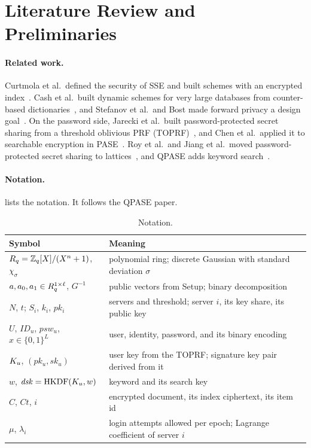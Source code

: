 \section{Literature Review and Preliminaries}
\label{sec:background}

\paragraph{Related work.} Curtmola et al.\ defined the security of SSE and built schemes with an encrypted
index~\cite{curtmola2006sse}. Cash et al.\ built dynamic schemes for very large databases from counter-based
dictionaries~\cite{cash2014dynamic}, and Stefanov et al.\ and Bost made forward privacy a design
goal~\cite{stefanov2014practical,bost2016sophos}. On the password side, Jarecki et al.\ built password-protected
secret sharing from a threshold oblivious PRF (TOPRF)~\cite{jarecki2016highly}, and Chen et al.\ applied it to
searchable encryption in PASE~\cite{chen2021pase}. Roy et al.\ and Jiang et al.\ moved password-protected secret
sharing to lattices~\cite{roy2021pps,jiang2024qpause}, and QPASE adds keyword search~\cite{jiang2024qpase}.

\paragraph{Notation.}  lists the notation. It follows the QPASE paper.

\begin{table}[ht]
\centering
\small
\caption{Notation.}
\label{tab:notation}
\begin{tabular}{ll}
\toprule
\textbf{Symbol} & \textbf{Meaning} \\
\midrule
$R_q = \mathbb{Z}_q[X]/(X^n+1)$, $\chi_\sigma$ & polynomial ring; discrete Gaussian with standard deviation $\sigma$ \\
$a, a_0, a_1 \in R_q^{1\times\ell}$, $G^{-1}$ & public vectors from Setup; binary decomposition \\
$N$, $t$; $S_i$, $k_i$, $pk_i$ & servers and threshold; server $i$, its key share, its public key \\
$U$, $ID_u$, $psw_u$, $x \in \{0,1\}^L$ & user, identity, password, and its binary encoding \\
$K_u$, $(pk_u, sk_u)$ & user key from the TOPRF; signature key pair derived from it \\
$w$, $\mathit{dsk} = \mathrm{HKDF}(K_u, w)$ & keyword and its search key \\
$C$, $Ct$, $i$ & encrypted document, its index ciphertext, its item id \\
$\mu$, $\lambda_i$ & login attempts allowed per epoch; Lagrange coefficient of server $i$ \\
\bottomrule
\end{tabular}
\end{table}

